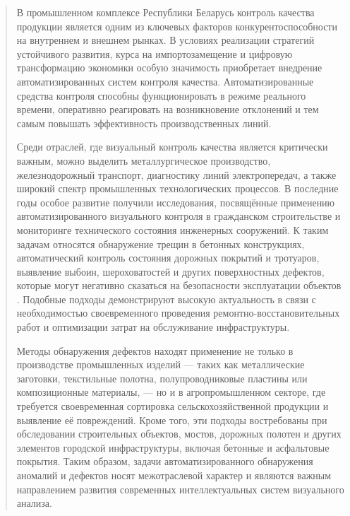 \documentclass[14pt,a4paper]{article}
\begin{document}
\begin{abstract}
В промышленном комплексе Республики Беларусь контроль качества продукции является одним из ключевых факторов конкурентоспособности на внутреннем и внешнем рынках. В условиях реализации стратегий устойчивого развития, курса на импортозамещение и цифровую трансформацию экономики особую значимость приобретает внедрение автоматизированных систем контроля качества. Автоматизированные средства контроля способны функционировать в режиме реального времени, оперативно реагировать на возникновение отклонений и тем самым повышать эффективность производственных линий.

Среди отраслей, где визуальный контроль качества является критически важным, можно выделить металлургическое производство, железнодорожный транспорт, диагностику линий электропередач, а также широкий спектр промышленных технологических процессов. В последние годы особое развитие получили исследования, посвящённые применению автоматизированного визуального контроля в гражданском строительстве и мониторинге технического состояния инженерных сооружений. К таким задачам относятся обнаружение трещин в бетонных конструкциях, автоматический контроль состояния дорожных покрытий и тротуаров, выявление выбоин, шероховатостей и других поверхностных дефектов, которые могут негативно сказаться на безопасности эксплуатации объектов . Подобные подходы демонстрируют высокую актуальность в связи с необходимостью своевременного проведения ремонтно-восстановительных работ и оптимизации затрат на обслуживание инфраструктуры.

Методы обнаружения дефектов находят применение не только в производстве промышленных изделий — таких как металлические заготовки, текстильные полотна, полупроводниковые пластины или композиционные материалы, — но и в агропромышленном секторе, где требуется своевременная сортировка сельскохозяйственной продукции и выявление её повреждений. Кроме того, эти подходы востребованы при обследовании строительных объектов, мостов, дорожных полотен и других элементов городской инфраструктуры, включая бетонные и асфальтовые покрытия. Таким образом, задачи автоматизированного обнаружения аномалий и дефектов носят межотраслевой характер и являются важным направлением развития современных интеллектуальных систем визуального анализа.


\end{abstract}
\end{document}
